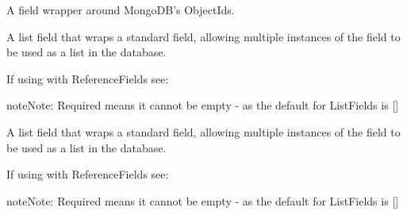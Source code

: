\documentclass[letterpaper,10pt,english]{sphinxmanual}
\begin{document}
\begin{fulllineitems}

\begin{fulllineitems}
\label{\detokenize{questionnaire:questionnaire.Questionnaire.id}}
A field wrapper around MongoDB's ObjectIds.

\end{fulllineitems}


\begin{fulllineitems}
\label{\detokenize{questionnaire:questionnaire.Questionnaire.objects}}
\end{fulllineitems}


\begin{fulllineitems}
\label{\detokenize{questionnaire:questionnaire.Questionnaire.perceived_ease_of_use_items}}
A list field that wraps a standard field, allowing multiple instances
of the field to be used as a list in the database.

If using with ReferenceFields see: 

\begin{sphinxadmonition}{note}{Note:}
Required means it cannot be empty - as the default for ListFields is {[}{]}
\end{sphinxadmonition}

\end{fulllineitems}


\begin{fulllineitems}
\label{\detokenize{questionnaire:questionnaire.Questionnaire.perceived_usefulness_items}}
A list field that wraps a standard field, allowing multiple instances
of the field to be used as a list in the database.

If using with ReferenceFields see: 

\begin{sphinxadmonition}{note}{Note:}
Required means it cannot be empty - as the default for ListFields is {[}{]}
\end{sphinxadmonition}

\end{fulllineitems}


\end{fulllineitems}
\end{document}
